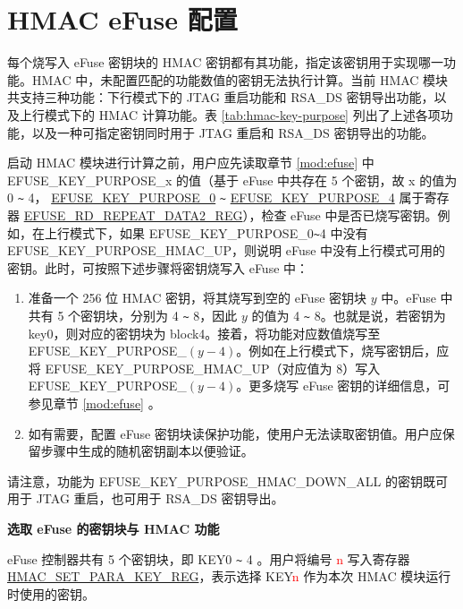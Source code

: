 \documentclass[main\_\_CN.tex]{subfiles}
\begin{document}
\section{HMAC eFuse 配置}
\label{sec:hmac-config-function}

每个烧写入 eFuse 密钥块的 HMAC 密钥都有其功能，指定该密钥用于实现哪一功能。HMAC 中，未配置匹配的功能数值的密钥无法执行计算。当前 HMAC 模块共支持三种功能：下行模式下的 JTAG 重启功能和 RSA\_DS 密钥导出功能，以及上行模式下的 HMAC 计算功能。表 \ref{tab:hmac-key-purpose} 列出了上述各项功能，以及一种可指定密钥同时用于 JTAG 重启和 RSA\_DS 密钥导出的功能。

启动 HMAC 模块进行计算之前，用户应先读取章节 \ref{mod:efuse} \textit{} 中 EFUSE\_KEY\_PURPOSE\_x 的值（基于 eFuse 中共存在 5 个密钥，故 x 的值为 0 \verb+~+ 4， \hyperref[fielddesc:EFUSEKEYPURPOSE0]{EFUSE\_KEY\_PURPOSE\_0} \verb+~+ \hyperref[fielddesc:EFUSEKEYPURPOSE1]{EFUSE\_KEY\_PURPOSE\_4} 属于寄存器 \hyperref[regdesc:EFUSERDREPEATDATA2REG]{EFUSE\_RD\_REPEAT\_DATA2\_REG}），检查 eFuse 中是否已烧写密钥。例如，在上行模式下，如果 EFUSE\_KEY\_PURPOSE\_0\verb+~+4 中没有 EFUSE\_KEY\_PURPOSE\_HMAC\_UP，则说明 eFuse 中没有上行模式可用的密钥。此时，可按照下述步骤将密钥烧写入 eFuse 中：

\begin{enumerate}
    \item 准备一个 256 位 HMAC 密钥，将其烧写到空的 eFuse 密钥块 $y$ 中。eFuse 中共有 5 个密钥块，分别为 4 \verb+~+ 8，因此 $y$ 的值为 4 \verb+~+ 8。也就是说，若密钥为 key0，则对应的密钥块为 block4。接着，将功能对应数值烧写至 EFUSE\_KEY\_PURPOSE\_$(y-4)$。例如在上行模式下，烧写密钥后，应将 EFUSE\_KEY\_PURPOSE\_HMAC\_UP（对应值为 8）写入 EFUSE\_KEY\_PURPOSE\_$(y-4)$。更多烧写 eFuse 密钥的详细信息，可参见章节 \ref{mod:efuse} \textit{}。
    \item 如有需要，配置 eFuse 密钥块读保护功能，使用户无法读取密钥值。用户应保留步骤中生成的随机密钥副本以便验证。
\end{enumerate}

请注意，功能为 EFUSE\_KEY\_PURPOSE\_HMAC\_DOWN\_ALL 的密钥既可用于 JTAG 重启，也可用于 RSA\_DS 密钥导出。



\textbf{选取 eFuse 的密钥块与 HMAC 功能}
\label{sec:hmac-config-purposes}

eFuse 控制器共有 5 个密钥块，即 KEY0 \verb+~+ 4 。用户将编号 \textcolor{red}{n} 写入寄存器 \hyperref[regdesc:HMACSETPARAKEYREG]{HMAC\_SET\_PARA\_KEY\_REG}，表示选择 KEY\textcolor{red}{n} 作为本次 HMAC 模块运行时使用的密钥。
\end{document}
